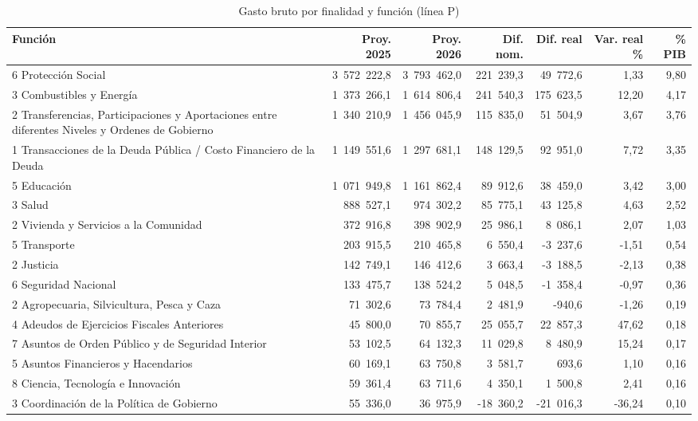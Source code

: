 \begin{table}[htbp]
\centering
\scriptsize
\caption{Gasto bruto por finalidad y función (línea P)}
\label{cua:C4_3}
\begin{tabular}{p{4.6cm}rrrrrr}
\toprule
\textbf{Función} & \textbf{Proy. 2025} & \textbf{Proy. 2026} & \textbf{Dif. nom.} & \textbf{Dif. real} & \textbf{Var. real \%} & \textbf{\% PIB} \\
\midrule
6 Protección Social & 3 572 222,8 & 3 793 462,0 & 221 239,3 & 49 772,6 & 1,33 & 9,80 \\
3 Combustibles y Energía & 1 373 266,1 & 1 614 806,4 & 241 540,3 & 175 623,5 & 12,20 & 4,17 \\
2 Transferencias, Participaciones y Aportaciones entre diferentes Niveles y Ordenes de Gobierno & 1 340 210,9 & 1 456 045,9 & 115 835,0 & 51 504,9 & 3,67 & 3,76 \\
1 Transacciones de la Deuda Pública / Costo Financiero de la Deuda & 1 149 551,6 & 1 297 681,1 & 148 129,5 & 92 951,0 & 7,72 & 3,35 \\
5 Educación & 1 071 949,8 & 1 161 862,4 & 89 912,6 & 38 459,0 & 3,42 & 3,00 \\
3 Salud & 888 527,1 & 974 302,2 & 85 775,1 & 43 125,8 & 4,63 & 2,52 \\
2 Vivienda y Servicios a la Comunidad & 372 916,8 & 398 902,9 & 25 986,1 & 8 086,1 & 2,07 & 1,03 \\
5 Transporte & 203 915,5 & 210 465,8 & 6 550,4 & -3 237,6 & -1,51 & 0,54 \\
2 Justicia & 142 749,1 & 146 412,6 & 3 663,4 & -3 188,5 & -2,13 & 0,38 \\
6 Seguridad Nacional & 133 475,7 & 138 524,2 & 5 048,5 & -1 358,4 & -0,97 & 0,36 \\
2 Agropecuaria, Silvicultura, Pesca y Caza & 71 302,6 & 73 784,4 & 2 481,9 & -940,6 & -1,26 & 0,19 \\
4 Adeudos de Ejercicios Fiscales Anteriores & 45 800,0 & 70 855,7 & 25 055,7 & 22 857,3 & 47,62 & 0,18 \\
7 Asuntos de Orden Público y de Seguridad Interior & 53 102,5 & 64 132,3 & 11 029,8 & 8 480,9 & 15,24 & 0,17 \\
5 Asuntos Financieros y Hacendarios & 60 169,1 & 63 750,8 & 3 581,7 & 693,6 & 1,10 & 0,16 \\
8 Ciencia, Tecnología e Innovación & 59 361,4 & 63 711,6 & 4 350,1 & 1 500,8 & 2,41 & 0,16 \\
3 Coordinación de la Política de Gobierno & 55 336,0 & 36 975,9 & -18 360,2 & -21 016,3 & -36,24 & 0,10 \\

\end{tabular}
\end{table}
